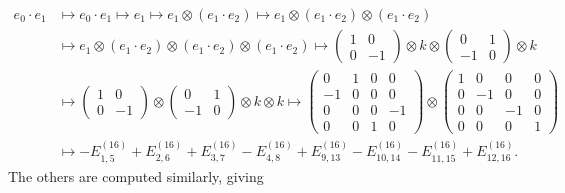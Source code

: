 \documentclass[pdftex]{sigma}
\numberwithin{equation}{section}
\begin{document}
		\begin{align}
			e_0 \cdot e_1 &\mapsto e_0 \cdot e_1 \mapsto e_1 \mapsto e_1 \otimes ( e_1 \cdot e_2 ) \mapsto e_1 \otimes ( e_1 \cdot e_2 ) \otimes ( e_1 \cdot e_2 ) \nonumber\\
			& \mapsto e_1 \otimes ( e_1 \cdot e_2 ) \otimes ( e_1 \cdot e_2 ) \otimes ( e_1 \cdot e_2 ) \mapsto \begin{pmatrix} 1 & 0 \\ 0 & -1 \end{pmatrix} \otimes k \otimes \begin{pmatrix} 0 & 1 \\ -1 & 0 \end{pmatrix} \otimes k \nonumber\\
			& \mapsto \begin{pmatrix} 1 & 0 \\ 0 & -1 \end{pmatrix} \otimes \begin{pmatrix} 0 & 1 \\ -1 & 0 \end{pmatrix} \otimes k \otimes k \mapsto \begin{pmatrix} 0 & 1 & 0 & 0 \\ -1& 0 & 0 & 0 \\ 0 & 0 & 0 & -1 \\ 0 & 0 & 1 & 0 \end{pmatrix} \otimes \begin{pmatrix} 1 & 0 & 0 & 0 \\ 0 & -1 & 0 & 0 \\ 0 & 0 & -1 & 0 \\ 0 & 0 & 0 & 1 \end{pmatrix} \nonumber\\
			&\mapsto -E^{(16)}_{1,5} + E^{(16)}_{2,6} + E^{(16)}_{3,7} - E^{(16)}_{4,8} + E^{(16)}_{9,13} - E^{(16)}_{10,14} - E^{(16)}_{11,15} + E^{(16)}_{12,16} .
			\label{eqn_number_spin9_parti}\end{align}
		The others are computed similarly, giving
\end{document}
